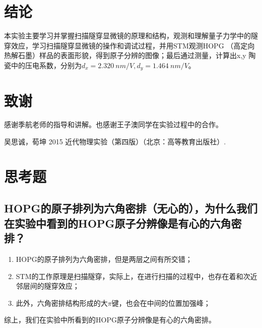 \documentclass[aps,pre,12pt,preprint,onecolumn,showpacs,showkeys]{revtex4-1}
\begin{document}
\section{结论}
本实验主要学习并掌握扫描隧穿显微镜的原理和结构，观测和理解量子力学中的隧穿效应，学习扫描隧穿显微镜的操作和调试过程，并用STM观测HOPG （高定向热解石墨）样品的表面形貌，得到原子分辨的图像；最后通过测量，计算出x,y 陶瓷中的压电系数，分别为$d_x = 2.320\ \si{nm\per V},d_y = 1.464\ \si{nm\per V}$。\par

\section{致谢}
感谢季航老师的指导和讲解。也感谢王子澳同学在实验过程中的合作。\par
%
\begin{thebibliography}{}
 吴思诚，荀坤 2015 近代物理实验（第四版）（北京：高等教育出版社）.
\end{thebibliography}

\clearpage
\appendix
\section{思考题}
\subsection{HOPG的原子排列为六角密排（无心的），为什么我们在实验中看到的HOPG原子分辨像是有心的六角密排？}
\begin{enumerate}
    \item HOPG的原子排列为六角密排，但是两层之间有所交错；
    \item STM的工作原理是扫描隧穿，实际上，在进行扫描的过程中，也存在着和次近邻层间的隧穿效应；
    \item 此外，六角密排结构形成的大$\pi$键，也会在中间的位置加强峰；
\end{enumerate}
综上，我们在实验中所看到的HOPG原子分辨像是有心的六角密排。
\end{document}
